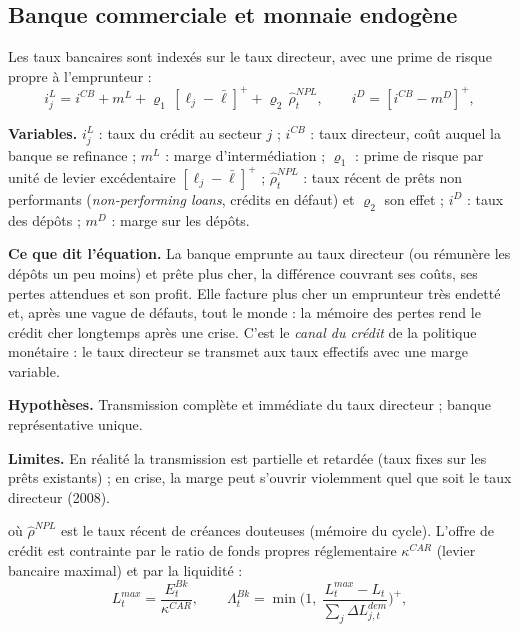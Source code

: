 \documentclass[11pt,a4paper]{article}
\newcommand{\variables}{\par\noindent\textbf{Variables.} }
\newcommand{\sens}{\par\noindent\textbf{Ce que dit l'équation.} }
\newcommand{\hyp}{\par\noindent\textbf{Hypothèses.} }
\newcommand{\limites}{\par\noindent\textbf{Limites.} }
\newcommand{\pos}[1]{{\left[#1\right]^{+}}}
\begin{document}
\begin{figure}[htbp]
\label{fig:mon}
\end{figure}

\subsection{Banque commerciale et monnaie endogène}
\label{sec:banques}
Les taux bancaires sont indexés sur le taux directeur, avec une prime de risque propre à l'emprunteur :
\begin{equation}
i^L_j = i^{CB} + m^L + \varrho_1\, \pos{\ell_j - \bar\ell} + \varrho_2\, \hat\rho^{NPL}_t, \qquad
i^D = \pos{i^{CB} - m^D},
\end{equation}
\begin{lecture}
\variables $i^L_j$ : taux du crédit au secteur $j$ ; $i^{CB}$ : taux directeur, coût auquel la banque se refinance ; $m^L$ : marge d'intermédiation ; $\varrho_1$ : prime de risque par unité de levier excédentaire $\pos{\ell_j-\bar\ell}$ ; $\hat\rho^{NPL}_t$ : taux récent de prêts non performants (\emph{non-performing loans}, crédits en défaut) et $\varrho_2$ son effet ; $i^D$ : taux des dépôts ; $m^D$ : marge sur les dépôts.
\sens La banque emprunte au taux directeur (ou rémunère les dépôts un peu moins) et prête plus cher, la différence couvrant ses coûts, ses pertes attendues et son profit. Elle facture plus cher un emprunteur très endetté et, après une vague de défauts, tout le monde : la mémoire des pertes rend le crédit cher longtemps après une crise. C'est le \emph{canal du crédit} de la politique monétaire : le taux directeur se transmet aux taux effectifs avec une marge variable.
\hyp Transmission complète et immédiate du taux directeur ; banque représentative unique.
\limites En réalité la transmission est partielle et retardée (taux fixes sur les prêts existants) ; en crise, la marge peut s'ouvrir violemment quel que soit le taux directeur (2008).
\end{lecture}
où $\hat\rho^{NPL}$ est le taux récent de créances douteuses (mémoire du cycle). L'offre de crédit est contrainte par le ratio de fonds propres réglementaire $\kappa^{CAR}$ (levier bancaire maximal) et par la liquidité :
\begin{equation}
L^{max}_t = \frac{E^{Bk}_t}{\kappa^{CAR}}, \qquad
\Lambda^{Bk}_t = \min\!\Big(1,\ \frac{L^{max}_t - L_t}{\sum_j \Delta L^{dem}_{j,t}}\Big)^{+},
\end{equation}
\end{document}
